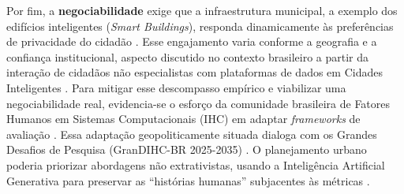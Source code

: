 \documentclass[12pt]{article}
\begin{document}
    Por fim, a \textbf{negociabilidade} exige que a infraestrutura municipal, a exemplo dos edifícios inteligentes (\textit{Smart Buildings}), responda dinamicamente às preferências de privacidade do cidadão \cite{bavaresco2019technological, Brombacher20221863}. Esse engajamento varia conforme a geografia e a confiança institucional, aspecto discutido no contexto brasileiro a partir da interação de cidadãos não especialistas com plataformas de dados em Cidades Inteligentes \cite{Belizario2023Interacao}. Para mitigar esse descompasso empírico e viabilizar uma negociabilidade real, evidencia-se o esforço da comunidade brasileira de Fatores Humanos em Sistemas Computacionais (IHC) em adaptar \textit{frameworks} de avaliação \cite{Belizario2023Interacao, Victorelli2020Human, barcellos2022towards}. Essa adaptação geopoliticamente situada dialoga com os Grandes Desafios de Pesquisa (GranDIHC-BR 2025-2035) \cite{Pereira}. O planejamento urbano poderia priorizar abordagens não extrativistas, usando a Inteligência Artificial Generativa para preservar as ``histórias humanas'' subjacentes às métricas \cite{ferreira2024connecting}.
    

\end{document}
